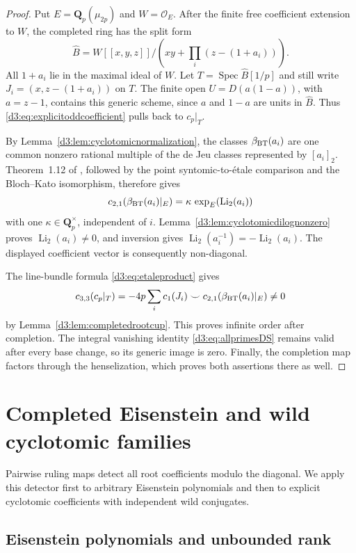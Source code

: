 \documentclass[11pt,a4paper]{amsart}
\numberwithin{equation}{section}
\theoremstyle{definition}
\theoremstyle{remark}
\newcommand{\Q}{\mathbf Q}
\newcommand{\OO}{\mathcal O}
\newcommand{\Spec}{\operatorname{Spec}}
\begin{document}
\begin{proof}
Put $E=\Q_p(\mu_{2p})$ and $W=\OO_E$.
After the finite free coefficient extension to $W$, the completed
ring has the split form
\[
 \widehat B=
 W[[x,y,z]]\Big/\left(xy+\prod_i(z-(1+a_i))\right).
\]
All $1+a_i$ lie in the maximal ideal of $W$.
Let $T=\Spec\widehat B[1/p]$ and still write
$J_i=(x,z-(1+a_i))$ on $T$.
The finite open $U=D(a(1-a))$, with $a=z-1$, contains this generic
scheme, since $a$ and $1-a$ are units in $\widehat B$.
Thus \eqref{d3:eq:explicitoddcoefficient} pulls back to $c_p|_T$.

By Lemma~\ref{d3:lem:cyclotomicnormalization}, the classes
$\beta_{\rm BT}(a_i)$ are one common nonzero rational multiple of
the de Jeu classes represented by $[a_i]_2$.
Theorem~1.12 of \cite{BesserDeJeu}, followed by the point
syntomic-to-\'etale comparison and the Bloch--Kato isomorphism,
therefore gives
\[
 c_{2,1}(\beta_{\rm BT}(a_i)|_E)
   =\kappa\,\exp_E(\operatorname{Li}_2(a_i))
\]
with one $\kappa\in\Q_p^\times$, independent of $i$.
Lemma~\ref{d3:lem:cyclotomicdilognonzero} proves
$\operatorname{Li}_2(a_i)\ne0$, and inversion gives
$\operatorname{Li}_2(a_i^{-1})=-\operatorname{Li}_2(a_i)$.
The displayed coefficient vector is consequently non-diagonal.

The line-bundle formula \eqref{d3:eq:etaleproduct} gives
\[
 c_{3,3}(c_p|_T)
 =-4p\sum_i c_1(J_i)\smile
                c_{2,1}(\beta_{\rm BT}(a_i)|_E)\ne0
\]
by Lemma~\ref{d3:lem:completedrootcup}.
This proves infinite order after completion.
The integral vanishing identity \eqref{d3:eq:allprimesDS} remains
valid after every base change, so its generic image is zero.
Finally, the completion map factors through the henselization,
which proves both assertions there as well.
\end{proof}

\section{Completed Eisenstein and wild cyclotomic families}\label{d3:sec:completedfamilies}
Pairwise ruling maps detect all root coefficients modulo the diagonal.
We apply this detector first to arbitrary Eisenstein polynomials and
then to explicit cyclotomic coefficients with independent wild conjugates.

\subsection{Eisenstein polynomials and unbounded rank}
\label{d3:sec:completedarbitraryrank}\label{d3:sec:completedtamerank}
\end{document}
